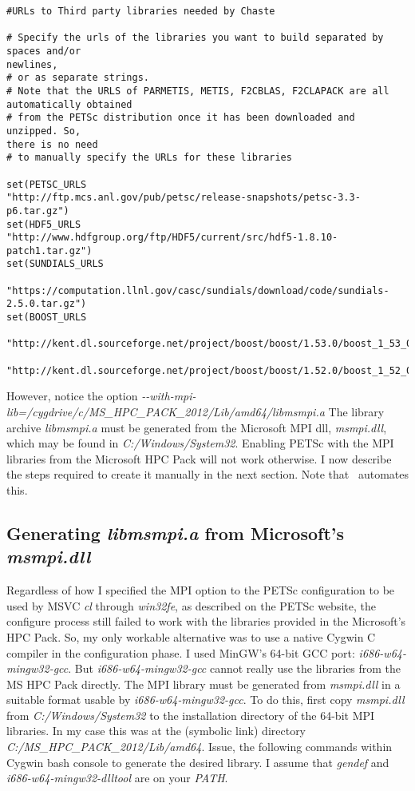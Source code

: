 \documentclass[10pt,a4paper]{article}
\begin{document}
\begin{codeparchment}
\begin{lstlisting}[]
#URLs to Third party libraries needed by Chaste

# Specify the urls of the libraries you want to build separated by spaces and/or
newlines,
# or as separate strings.
# Note that the URLS of PARMETIS, METIS, F2CBLAS, F2CLAPACK are all
automatically obtained
# from the PETSc distribution once it has been downloaded and unzipped. So,
there is no need
# to manually specify the URLs for these libraries 

set(PETSC_URLS
"http://ftp.mcs.anl.gov/pub/petsc/release-snapshots/petsc-3.3-p6.tar.gz")
set(HDF5_URLS
"http://www.hdfgroup.org/ftp/HDF5/current/src/hdf5-1.8.10-patch1.tar.gz")
set(SUNDIALS_URLS 
      
"https://computation.llnl.gov/casc/sundials/download/code/sundials-2.5.0.tar.gz")
set(BOOST_URLS
        
"http://kent.dl.sourceforge.net/project/boost/boost/1.53.0/boost_1_53_0.tar.gz" 
			  
"http://kent.dl.sourceforge.net/project/boost/boost/1.52.0/boost_1_52_0.tar.gz")
\end{lstlisting}
\end{codeparchment}
 
However, notice the option
\textit{{-}-with-mpi-lib=/cygdrive/c/MS\_HPC\_PACK\_2012/Lib/amd64/libmsmpi.a}
The library archive \textit{libmsmpi.a} must be generated from the Microsoft MPI
dll, \textit{msmpi.dll}, which may be found in \textit{C:/Windows/System32}.
Enabling PETSc with the MPI libraries from the Microsoft HPC Pack will not work
otherwise. I now describe the steps required to create it manually in the next
section. Note that \chastelibbuilder\ automates this.

\subsection{Generating \textit{libmsmpi.a} from Microsoft's \textit{msmpi.dll}}
Regardless of how I specified the MPI option to the PETSc configuration to be
used by MSVC \textit{cl} through \textit{win32fe}, as described on the PETSc
website, the configure process still failed to work with the libraries provided
in the Microsoft's HPC Pack. So, my only workable alternative was to use a
native Cygwin C compiler in the configuration phase. I used MinGW's 64-bit GCC
port: \textit{i686-w64-mingw32-gcc}. But \textit{i686-w64-mingw32-gcc} cannot
really use the libraries from the MS HPC Pack directly. The MPI library must be
generated from \textit{msmpi.dll} in a suitable format usable by
\textit{i686-w64-mingw32-gcc}. To do this, first copy \textit{msmpi.dll} from
\textit{C:/Windows/System32} to the installation directory of the 64-bit MPI
libraries. In my case this was at the (symbolic link) directory
\textit{C:/MS\_HPC\_PACK\_2012/Lib/amd64}. Issue, the following commands within
Cygwin bash console to generate the desired library. I assume that
\textit{gendef} and \textit{i686-w64-mingw32-dlltool} are on your \textit{PATH}.
\end{document}
